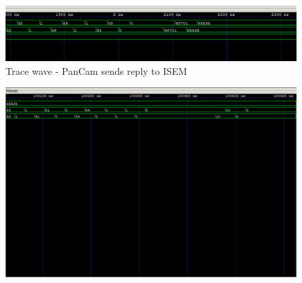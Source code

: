 \documentclass[12pt,a4paper]{article}
\begin{document}
\begin{figure}[hb]
	\centering
    \includegraphics[scale = 0.7]{results/tracewave_3.png}
    \caption{Trace wave - PanCam sends reply to ISEM}
\end{figure}

\begin{figure}[hb]
	\centering
    \includegraphics[scale = 0.36]{results/tracewave_4.png}

\end{figure}
\end{document}
